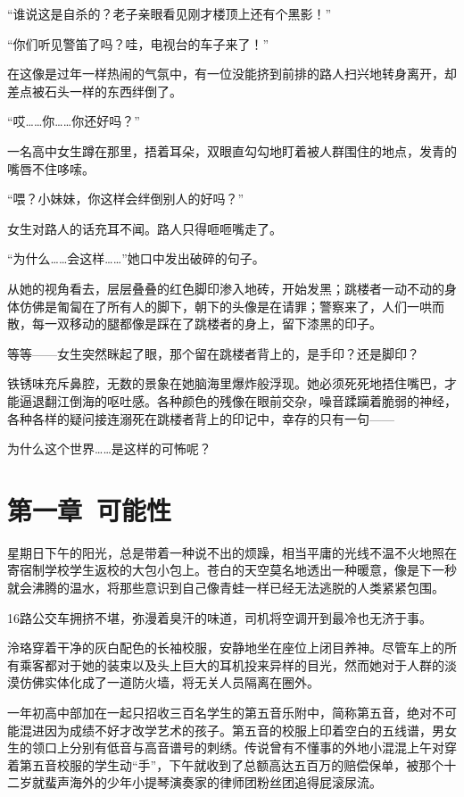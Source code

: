 \documentclass[UTF8, scheme = chinese, openany]{ctexbook}
\begin{document}
“谁说这是自杀的？老子亲眼看见刚才楼顶上还有个黑影！”

“你们听见警笛了吗？哇，电视台的车子来了！”

在这像是过年一样热闹的气氛中，有一位没能挤到前排的路人扫兴地转身离开，却差点被石头一样的东西绊倒了。

“哎……你……你还好吗？”

一名高中女生蹲在那里，捂着耳朵，双眼直勾勾地盯着被人群围住的地点，发青的嘴唇不住哆嗦。

“喂？小妹妹，你这样会绊倒别人的好吗？”

女生对路人的话充耳不闻。路人只得咂咂嘴走了。

“为什么……会这样……”她口中发出破碎的句子。

从她的视角看去，层层叠叠的红色脚印渗入地砖，开始发黑；跳楼者一动不动的身体仿佛是匍匐在了所有人的脚下，朝下的头像是在请罪；警察来了，人们一哄而散，每一双移动的腿都像是踩在了跳楼者的身上，留下漆黑的印子。

等等——女生突然眯起了眼，那个留在跳楼者背上的，是手印？还是脚印？

铁锈味充斥鼻腔，无数的景象在她脑海里爆炸般浮现。她必须死死地捂住嘴巴，才能逼退翻江倒海的呕吐感。各种颜色的残像在眼前交杂，噪音蹂躏着脆弱的神经，各种各样的疑问接连溺死在跳楼者背上的印记中，幸存的只有一句——

为什么这个世界……是这样的可怖呢？

\chapter{第一章\ 可能性}

星期日下午的阳光，总是带着一种说不出的烦躁，相当平庸的光线不温不火地照在寄宿制学校学生返校的大包小包上。苍白的天空莫名地透出一种暖意，像是下一秒就会沸腾的温水，将那些意识到自己像青蛙一样已经无法逃脱的人类紧紧包围。

16路公交车拥挤不堪，弥漫着臭汗的味道，司机将空调开到最冷也无济于事。

泠珞穿着干净的灰白配色的长袖校服，安静地坐在座位上闭目养神。尽管车上的所有乘客都对于她的装束以及头上巨大的耳机投来异样的目光，然而她对于人群的淡漠仿佛实体化成了一道防火墙，将无关人员隔离在圈外。

一年初高中部加在一起只招收三百名学生的第五音乐附中，简称第五音，绝对不可能混进因为成绩不好才改学艺术的孩子。第五音的校服上印着空白的五线谱，男女生的领口上分别有低音与高音谱号的刺绣。传说曾有不懂事的外地小混混上午对穿着第五音校服的学生动“手”，下午就收到了总额高达五百万的赔偿保单，被那个十二岁就蜚声海外的少年小提琴演奏家的律师团粉丝团追得屁滚尿流。
\end{document}
